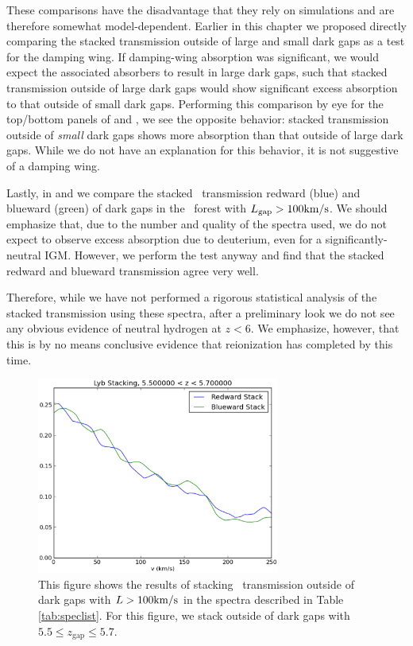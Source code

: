These comparisons have the disadvantage that they rely on simulations and are therefore somewhat model-dependent. Earlier in this chapter we proposed directly comparing the stacked transmission outside of large and small dark gaps as a test for the damping wing. If damping-wing absorption was significant, we would expect the associated absorbers to result in large dark gaps, such that stacked transmission outside of large dark gaps would show significant excess absorption to that outside of small dark gaps. Performing this comparison by eye for the top/bottom panels of  and , we see the opposite behavior: stacked transmission outside of \textit{small} dark gaps shows more absorption than that outside of large dark gaps. While we do not have an explanation for this behavior, it is not suggestive of a damping wing.


Lastly, in  and  we compare the stacked \lyb\ transmission redward (blue) and blueward (green) of dark gaps in the \lyb\ forest with $L_{\text{gap}} > 100\text{km}/\text{s}$. We should emphasize that, due to the number and quality of the spectra used, we do not expect to observe excess absorption due to deuterium, even for a significantly-neutral IGM. However, we perform the test anyway and find that the stacked redward and blueward transmission agree very well. 


Therefore, while we have not performed a rigorous statistical analysis of the stacked transmission using these spectra, after a preliminary look we do not see any obvious evidence of neutral hydrogen at $z < 6$. We emphasize, however, that this is by no means conclusive evidence that reionization has completed by this time. 

\begin{figure}[!ht]
  \centering
  \includegraphics[width=8cm]{Lyb_lowz.eps}
  \caption{This figure shows the results of stacking \lyb\ transmission outside of dark gaps with $L > 100\text{km}/\text{s}$ in the spectra described in Table \ref{tab:speclist}. For this figure, we stack outside of dark gaps with $5.5 \leq z_{\text{gap}} \leq 5.7$.}
  \label{fig:dcheck_lowz}
\end{figure}

